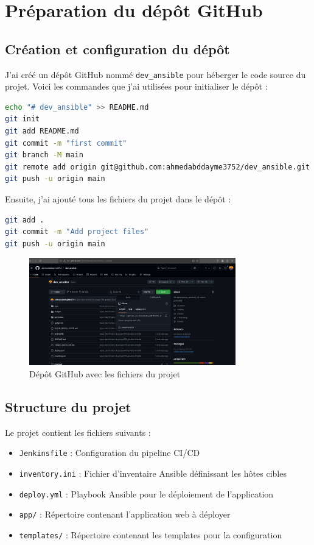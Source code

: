 \documentclass{article}
\begin{document}
\section{Préparation du dépôt GitHub}
\subsection{Création et configuration du dépôt}

J'ai créé un dépôt GitHub nommé \texttt{dev\_ansible} pour héberger le code source du projet. Voici les commandes que j'ai utilisées pour initialiser le dépôt :

\begin{lstlisting}[language=bash]
echo "# dev_ansible" >> README.md
git init
git add README.md
git commit -m "first commit"
git branch -M main
git remote add origin git@github.com:ahmedabddayme3752/dev_ansible.git
git push -u origin main
\end{lstlisting}

Ensuite, j'ai ajouté tous les fichiers du projet dans le dépôt :

\begin{lstlisting}[language=bash]
git add .
git commit -m "Add project files"
git push -u origin main
\end{lstlisting}

\begin{figure}[h]
    \centering
    \includegraphics[width=0.8\textwidth]{images/github_repo.png}
    \caption{Dépôt GitHub avec les fichiers du projet}
    \label{fig:github_repo}
\end{figure}

\subsection{Structure du projet}
Le projet contient les fichiers suivants :
\begin{itemize}
    \item \texttt{Jenkinsfile} : Configuration du pipeline CI/CD
    \item \texttt{inventory.ini} : Fichier d'inventaire Ansible définissant les hôtes cibles
    \item \texttt{deploy.yml} : Playbook Ansible pour le déploiement de l'application
    \item \texttt{app/} : Répertoire contenant l'application web à déployer
    \item \texttt{templates/} : Répertoire contenant les templates pour la configuration
\end{itemize}
\end{document}
